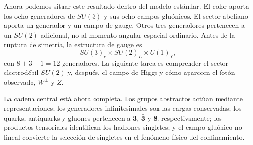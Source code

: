 Ahora podemos situar este resultado dentro del modelo estándar. El color aporta los ocho generadores de \(SU(3)\) y sus ocho campos gluónicos. El sector abeliano aporta un generador y un campo de gauge. Otros tres generadores pertenecen a un \(SU(2)\) adicional, no al momento angular espacial ordinario. Antes de la ruptura de simetría, la estructura de gauge es
\begin{equation}
SU(3)_c\times SU(2)_L\times U(1)_Y,
\end{equation}
con \(8+3+1=12\) generadores. La siguiente tarea es comprender el sector electrodébil \(SU(2)\) y, después, el campo de Higgs y cómo aparecen el fotón observado, \(W^\pm\) y \(Z\).

La cadena central está ahora completa. Los grupos abstractos actúan mediante representaciones; los generadores infinitesimales son las cargas conservadas; los quarks, antiquarks y gluones pertenecen a \(\boldsymbol 3\),
\(\bar{\boldsymbol 3}\) y \(\boldsymbol 8\), respectivamente; los productos tensoriales identifican los hadrones singletes; y el campo gluónico no lineal convierte la selección de singletes en el fenómeno físico del confinamiento.
